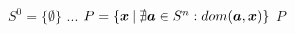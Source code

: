 \begin{algorithmic}[1]
    \State $S^0 = \big\{\emptyset\big\}$
      ...
    \EndFor
  \State $P = \{\boldsymbol{x} \:|\: \nexists \boldsymbol{a} \in S^n: dom(\boldsymbol{a}, \boldsymbol{x}) \}$
  \State \Return $P$
  \EndFunction
\end{algorithmic}
